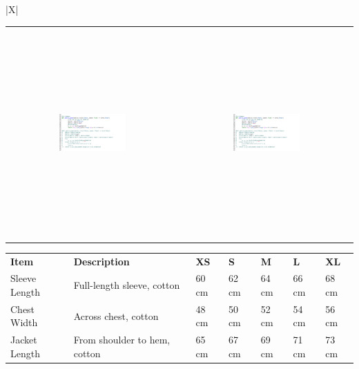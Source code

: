 \documentclass[landscape]{article}
\begin{document}
\noindent\begin{tabularx}{\textwidth}{|X|}
\hline
{} \\
\hline
\begin{center}
\begin{tabular}{cc}
\includegraphics[width=0.4\textwidth,height=8cm,keepaspectratio]{Screenshot_2025-03-09_at_15.26.02.png} &
\includegraphics[width=0.4\textwidth,height=8cm,keepaspectratio]{Screenshot_2025-03-09_at_15.26.02.png} \\
\end{tabular}
\end{center}
\end{tabularx}
\hline

\vspace{0.5cm}

\newpage
\noindent\begin{tabularx}{\textwidth}{|X|X|X|X|X|X|X|}
\hline
\rowcolor{headerred}\multicolumn{7}{|c|}{\textcolor{white}{\textbf{MEASUREMENTS}}} \\
\hline
\textbf{Item} & \textbf{Description} & \textbf{XS} & \textbf{S} & \textbf{M} & \textbf{L} & \textbf{XL}\\
\hline
Sleeve Length & Full-length sleeve, cotton & 60 cm & 62 cm & 64 cm & 66 cm & 68 cm \\
\hline
Chest Width & Across chest, cotton & 48 cm & 50 cm & 52 cm & 54 cm & 56 cm \\
\hline
Jacket Length & From shoulder to hem, cotton & 65 cm & 67 cm & 69 cm & 71 cm & 73 cm \\
\hline
\end{tabularx}
\end{document}
